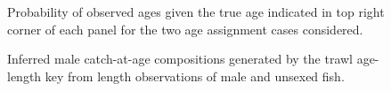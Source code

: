 \documentclass[11pt]{book}
\begin{document}
\begin{figure}[htb]

{\centering {} 

}

\caption{Probability of observed ages given the true age indicated in top right corner of each panel for the two age assignment cases considered.}\label{fig:unnamed-chunk-31}
\end{figure}
\newpage
\begin{figure}[htb]

{\centering {} 

}

\caption{Inferred male catch-at-age compositions generated by the trawl age-length key from length observations of male and unsexed fish.}\label{fig:unnamed-chunk-32}
\end{figure}
\end{document}
